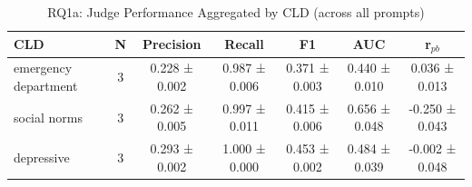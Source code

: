\begin{table}[htbp]
\centreing
\caption{RQ1a: Judge Performance Aggregated by CLD (across all prompts)}
\label{tab:rq1a_by_cld}
\begin{tabular}{lcccccc}
\toprule
\textbf{CLD} & \textbf{N} & \textbf{Precision} & \textbf{Recall} & \textbf{F1} & \textbf{AUC} & \textbf{r$_{pb}$} \\
\midrule
emergency department & 3 & 0.228 ± 0.002 & 0.987 ± 0.006 & 0.371 ± 0.003 & 0.440 ± 0.010 & 0.036 ± 0.013 \\
social norms & 3 & 0.262 ± 0.005 & 0.997 ± 0.011 & 0.415 ± 0.006 & 0.656 ± 0.048 & -0.250 ± 0.043 \\
depressive & 3 & 0.293 ± 0.002 & 1.000 ± 0.000 & 0.453 ± 0.002 & 0.484 ± 0.039 & -0.002 ± 0.048 \\
\bottomrule
\end{tabular}
\end{table}